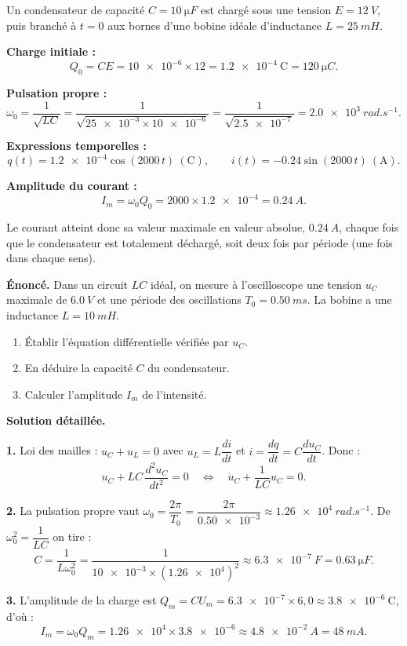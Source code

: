 \documentclass[11pt]{article}
\begin{document}
\begin{exemplebox}
Un condensateur de capacité $C = \SI{10}{\micro F}$ est chargé sous une tension $E = \SI{12}{V}$, puis branché à $t = 0$ aux bornes d'une bobine idéale d'inductance $L = \SI{25}{mH}$.

\textbf{Charge initiale :}
\[ Q_0 = CE = \num{10e-6} \times 12 = \num{1,2e-4}\ \mathrm{C} = \SI{120}{\micro C}. \]

\textbf{Pulsation propre :}
\[ \omega_0 = \dfrac{1}{\sqrt{LC}} = \dfrac{1}{\sqrt{\num{25e-3} \times \num{10e-6}}} = \dfrac{1}{\sqrt{\num{2,5e-7}}} = \SI{2,0e3}{rad.s^{-1}}. \]

\textbf{Expressions temporelles :}
\[ q(t) = \num{1,2e-4}\cos(2000\,t)\ \mathrm{(C)}, \qquad i(t) = -\num{0,24}\sin(2000\,t)\ \mathrm{(A)}. \]

\textbf{Amplitude du courant :}
\[ I_m = \omega_0 Q_0 = 2000 \times \num{1,2e-4} = \SI{0,24}{A}. \]

Le courant atteint donc sa valeur maximale en valeur absolue, $\SI{0,24}{A}$, chaque fois que le condensateur est totalement déchargé, soit deux fois par période (une fois dans chaque sens).
\end{exemplebox}

\begin{exoresolu}
\textbf{Énoncé.} Dans un circuit $LC$ idéal, on mesure à l'oscilloscope une tension $u_C$ maximale de $\SI{6,0}{V}$ et une période des oscillations $T_0 = \SI{0,50}{ms}$. La bobine a une inductance $L = \SI{10}{mH}$.
\begin{enumerate}
\item Établir l'équation différentielle vérifiée par $u_C$.
\item En déduire la capacité $C$ du condensateur.
\item Calculer l'amplitude $I_m$ de l'intensité.
\end{enumerate}
\tcblower
\textbf{Solution détaillée.}

\textbf{1.} Loi des mailles : $u_C + u_L = 0$ avec $u_L = L\dfrac{di}{dt}$ et $i = \dfrac{dq}{dt} = C\dfrac{du_C}{dt}$. Donc :
\[ u_C + LC\,\dfrac{d^2u_C}{dt^2} = 0 \quad\Longleftrightarrow\quad \ddot{u}_C + \dfrac{1}{LC}u_C = 0. \]

\textbf{2.} La pulsation propre vaut $\omega_0 = \dfrac{2\pi}{T_0} = \dfrac{2\pi}{\num{0,50e-3}} \approx \SI{1,26e4}{rad.s^{-1}}$. De $\omega_0^2 = \dfrac{1}{LC}$ on tire :
\[ C = \dfrac{1}{L\omega_0^2} = \dfrac{1}{\num{10e-3}\times(\num{1,26e4})^2} \approx \SI{6,3e-7}{F} = \SI{0,63}{\micro F}. \]

\textbf{3.} L'amplitude de la charge est $Q_m = CU_m = \num{6,3e-7}\times 6{,}0 \approx \num{3,8e-6}\ \mathrm{C}$, d'où :
\[ I_m = \omega_0 Q_m = \num{1,26e4}\times\num{3,8e-6} \approx \SI{4,8e-2}{A} = \SI{48}{mA}. \]
\end{exoresolu}
\end{document}
